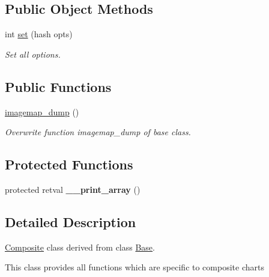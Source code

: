\subsection*{Public Object Methods}
\label{_amgrpfb74d91261823cc595bbeff1eff2b9d5}
 \begin{DoxyCompactItemize}
\item 
int \hyperlink{classChart_1_1Composite_a00e87797c96ce57efc6b066cbe7d6333}{set} (hash opts)
\begin{DoxyCompactList}\small\item\em Set all options. \item\end{DoxyCompactList}\end{DoxyCompactItemize}
\subsection*{Public Functions}
\label{_amgrpda6bc86800313ecde6e56bd1b41a7c55}
 \begin{DoxyCompactItemize}
\item 
\hyperlink{classChart_1_1Composite_ab8dbbeec3544f8e9b1b10486aa46459d}{imagemap\_\-dump} ()
\begin{DoxyCompactList}\small\item\em Overwrite function imagemap\_\-dump of base class. \item\end{DoxyCompactList}\end{DoxyCompactItemize}
\subsection*{Protected Functions}
\label{_amgrp1be0c318101080497e412caf5a02ec65}
 \begin{DoxyCompactItemize}
\item 
\hypertarget{classChart_1_1Composite_ada84d557f9ee7ba91de68103b092ec05}{
protected retval {\bfseries \_\-\_\-print\_\-array} ()}
\label{classChart_1_1Composite_ada84d557f9ee7ba91de68103b092ec05}

\end{DoxyCompactItemize}


\subsection{Detailed Description}
\hyperlink{classChart_1_1Composite}{Composite} class derived from class \hyperlink{classChart_1_1Base}{Base}. \par
 This class provides all functions which are specific to composite charts 

